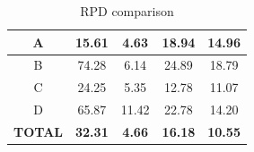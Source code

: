 \begin{table}[H]
\begin{tabular}{|c|c|c|c|c|}
A                                                                                       & 15.61                                                                                      & 4.63                                                                                                  & 18.94                                                                                                    & 14.96                                                                                                     \\ \hline
B                                                                                       & 74.28                                                                                      & 6.14                                                                                                  & 24.89                                                                                                    & 18.79                                                                                                     \\ \hline
C                                                                                       & 24.25                                                                                      & 5.35                                                                                                  & 12.78                                                                                                    & 11.07                                                                                                     \\ \hline
D                                                                                       & 65.87                                                                                      & 11.42                                                                                                 & 22.78                                                                                                    & 14.20                                                                                                     \\ \hline
\multicolumn{1}{|l|}{\textbf{TOTAL}}                                                    & \textbf{32.31}                                                                             & \textbf{4.66}                                                                                         & \textbf{16.18}                                                                                           & \textbf{10.55}                                                                                            \\ \hline
\end{tabular}
\caption{RPD comparison}
\label{tblRpdComparison}
\end{table}



